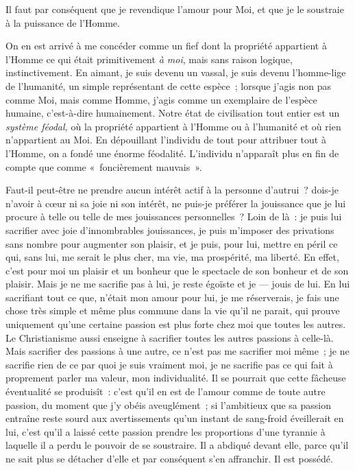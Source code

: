 \documentclass[french,twoside]{book} %
\begin{document}
Il faut par conséquent que je revendique l’amour pour Moi, et que je le soustraie à la puissance de l’Homme.\par
On en est arrivé à me concéder comme un fief dont la propriété appartient à l’Homme ce qui était primitivement \emph{à moi}, mais sans raison logique, instinctivement. En aimant, je suis devenu un vassal, je suis devenu l’homme-lige de l’humanité, un simple représentant de cette espèce ; lorsque j’agis non pas comme Moi, mais comme Homme, j’agis comme un exemplaire de l’espèce humaine, c’est-à-dire humainement. Notre état de civilisation tout entier est un \emph{système féodal,} où la propriété appartient à l’Homme ou à l’humanité et où rien n’appartient au Moi. En dépouillant l’individu de tout pour attribuer tout à l’Homme, on a fondé une énorme féodalité. L’individu  n’apparaît plus en fin de compte que comme « foncièrement mauvais ».\par
Faut-il peut-être ne prendre aucun intérêt actif à la personne d’autrui ? dois-je n’avoir à cœur ni sa joie ni son intérêt, ne puis-je préférer la jouissance que je lui procure à telle ou telle de mes jouissances personnelles ? Loin de là : je puis lui sacrifier avec joie d’innombrables jouissances, je puis m’imposer des privations sans nombre pour augmenter son plaisir, et je puis, pour lui, mettre en péril ce qui, sans lui, me serait le plus cher, ma vie, ma prospérité, ma liberté. En effet, c’est pour moi un plaisir et un bonheur que le spectacle de son bonheur et de son plaisir. Mais je ne me sacrifie pas à lui, je reste égoïste et je — jouis de lui. En lui sacrifiant tout ce que, n’était mon amour pour lui, je me réserverais, je fais une chose très simple et même plus commune dans la vie qu’il ne parait, qui prouve uniquement qu’une certaine passion est plus forte chez moi que toutes les autres. Le Christianisme aussi enseigne à sacrifier toutes les autres passions à celle-là. Mais sacrifier des passions à une autre, ce n’est pas me sacrifier moi même ; je ne sacrifie rien de ce par quoi je suis vraiment moi, je ne sacrifie pas ce qui fait à proprement parler ma valeur, mon individualité. Il se pourrait que cette fâcheuse éventualité se produisît : c’est qu’il en est de l’amour comme de toute autre passion, du moment que j’y obéis aveuglément ; si l’ambitieux que sa passion entraîne reste sourd aux avertissements qu’un instant de sang-froid éveillerait en lui, c’est qu’il a laissé cette passion prendre les proportions d’une tyrannie à laquelle il a perdu le pouvoir de se soustraire. Il a abdiqué devant elle, parce qu’il ne sait plus se détacher d’elle et par conséquent s’en affranchir. Il est possédé.\par
\end{document}

